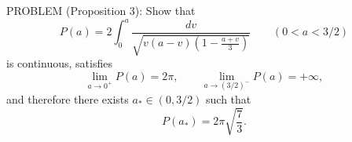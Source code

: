 PROBLEM (Proposition 3): Show that
\[
P(a) = 2\int_0^a \frac{dv}{\sqrt{v(a-v)\!\left(1 - \frac{a+v}{3}\right)}} \qquad (0 < a < 3/2)
\]
is continuous, satisfies
\[
\lim_{a \to 0^+} P(a) = 2\pi, \qquad \lim_{a \to (3/2)^-} P(a) = +\infty,
\]
and therefore there exists $a_* \in (0, 3/2)$ such that
\[
P(a_*) = 2\pi\sqrt{\frac{7}{3}}.
\]
